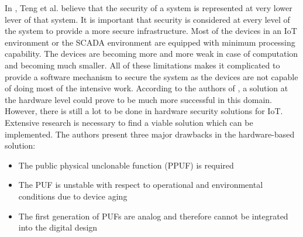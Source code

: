 \documentclass[letterpaper, 10 pt, conference]{ieeeconf}  %
\begin{document}
\begin{itemize}
In \cite{c10}, Teng et al. believe that the security of a system is represented at very lower lever of that system. It is important that security is considered at every level of the system to provide a more secure infrastructure. Most of the devices in an IoT environment or the SCADA environment are equipped with minimum processing capability. The devices are becoming more and more weak in case of computation and becoming much smaller. All of these limitations makes it complicated to provide a software mechanism to secure the system as the devices are not capable of doing most of the intensive work.
According to the authors of \cite{c10}, a solution at the hardware level could prove to be much more successful in this domain. However, there is still a lot to be done in hardware security solutions for IoT. Extensive research is necessary to find a viable solution which can be implemented. The authors present three major drawbacks in the hardware-based solution:
\begin{itemize}
\item The public physical unclonable function (PPUF) is required
\item The PUF is unstable with respect to operational and environmental conditions due to device aging
\item The first generation of PUFs are analog and therefore cannot be integrated into the digital design
\end{itemize}
\end{itemize}
\end{document}
